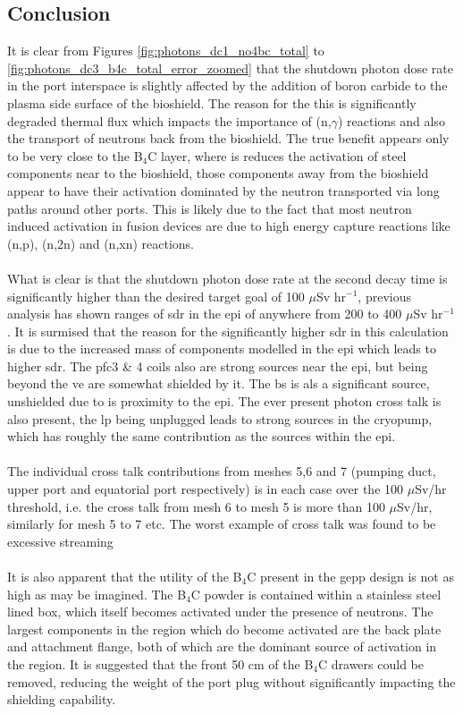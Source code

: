 \documentclass[12pt]{article}
\begin{document}
\subsection{Conclusion}
It is clear from Figures \ref{fig:photons_dc1_no4bc_total} to 
\ref{fig:photons_dc3_b4c_total_error_zoomed} that the shutdown photon dose rate 
in the port interspace is slightly affected by the addition of boron carbide 
to the plasma side surface of the bioshield. The reason for the this is 
significantly degraded thermal flux which impacts the importance of (n,$\gamma$)
 reactions and also the transport of neutrons back from the bioshield. The true 
benefit appears only to be very close to the B$_4$C layer, where is reduces the
activation of steel components near to the bioshield, those components away
from the bioshield appear to have their activation dominated by the neutron
transported via long paths around other ports. This is  likely due to the fact
that most neutron induced activation in fusion devices are due to high energy
capture reactions like (n,p), (n,2n) and (n,xn) reactions.
\\
\\
What is clear is that the shutdown photon dose rate at the second decay time is
significantly higher than the desired target goal of 100 $\mu$Sv hr$^{-1}$,
previous analysis has shown ranges of \gls{sdr} in the \gls{epi} of anywhere
from 200 to 400 $\mu$Sv hr$^{-1}$. It is surmised that the reason for the
significantly higher \gls{sdr} in this calculation is due to the increased
mass of components modelled in the \gls{epi} which leads to higher \gls{sdr}.
The \gls{pfc}3 \& 4 coils also are strong sources near the \gls{epi}, but being
beyond the \gls{ve} are somewhat shielded by it. The \gls{bs} is als a
significant source, unshielded due to is proximity to the \gls{epi}. The ever
present photon cross talk is also present, the \gls{lp} being unplugged leads
to strong sources in the cryopump, which has roughly the same contribution
as the sources within the \gls{epi}.
\\
\\
The individual cross talk contributions from meshes 5,6 and 7 (pumping duct, 
upper port and equatorial port respectively) is in each case over the 100 
$\mu$Sv/hr threshold, i.e. the cross talk from mesh 6 to mesh 5 is more than 100 
$\mu$Sv/hr, similarly for mesh 5 to 7 etc. The worst example of cross talk was 
found to be excessive streaming 
\\
\\
It is also apparent that the utility of the B$_4$C present in the \gls{gepp}
design is not as high as may be imagined. The B$_4$C powder is contained within
a stainless steel lined box, which itself becomes activated under the presence
of neutrons. The largest components in the region which do become activated are
the back plate and attachment flange, both of which are the dominant source of
activation in the region. It is suggested that the front 50 cm of the B$_4$C
drawers could be removed, reducing the weight of the port plug without
significantly impacting the shielding capability.
\end{document}
